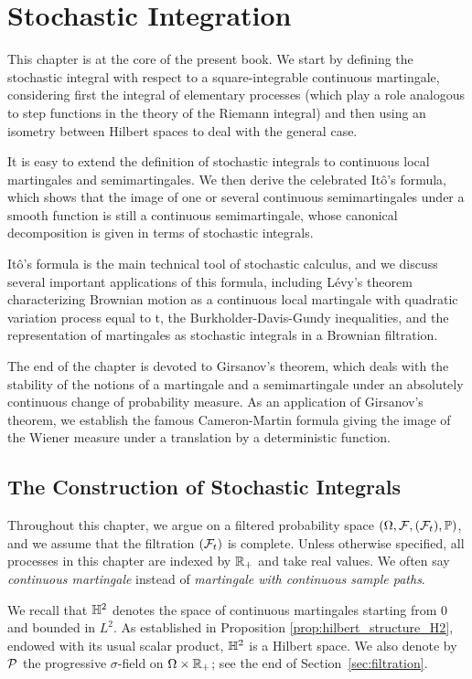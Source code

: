 \documentclass[../Main.tex]{subfiles}
\begin{document}
\chapter{Stochastic Integration}
This chapter is at the core of the present book. We start by defining the stochastic integral with respect to a square-integrable continuous martingale, considering first the integral of elementary processes (which play a role analogous to step functions in the theory of the Riemann integral) and then using an isometry between Hilbert spaces to deal with the general case.

It is easy to extend the definition of stochastic integrals to continuous local martingales and semimartingales. We then derive the celebrated Itô's formula, which shows that the image of one or several continuous semimartingales under a smooth function is still a continuous semimartingale, whose canonical decomposition is given in terms of stochastic integrals.

Itô's formula is the main technical tool of stochastic calculus, and we discuss several important applications of this formula, including Lévy's theorem characterizing Brownian motion as a continuous local martingale with quadratic variation process equal to t, the Burkholder-Davis-Gundy inequalities, and the representation of martingales as stochastic integrals in a Brownian filtration.

The end of the chapter is devoted to Girsanov's theorem, which deals with the stability of the notions of a martingale and a semimartingale under an absolutely continuous change of probability measure. As an application of Girsanov's theorem, we establish the famous Cameron-Martin formula giving the image of the Wiener measure under a translation by a deterministic function.

\section{The Construction of Stochastic Integrals}

Throughout this chapter, we argue on a filtered probability space
$(\Omega,\F,(\F_t),\PP)$, and we assume that the filtration $(\F_t)$ is complete. Unless otherwise specified, all processes in this chapter are indexed by $\RR_+$ and take real values. We often say \textit{continuous martingale} instead of \textit{martingale with continuous sample paths}.

We recall that $\HH^2$ denotes the space of continuous martingales
starting from $0$ and bounded in $L^2$. As established in Proposition
\ref{prop:hilbert_structure_H2}, endowed with its usual scalar product,
$\HH^2$ is a Hilbert space. We also denote by $\P$ the
progressive $\sigma$-field on $\Omega\times\RR_+$; see the end of
Section~\ref{sec:filtration}.
\end{document}
